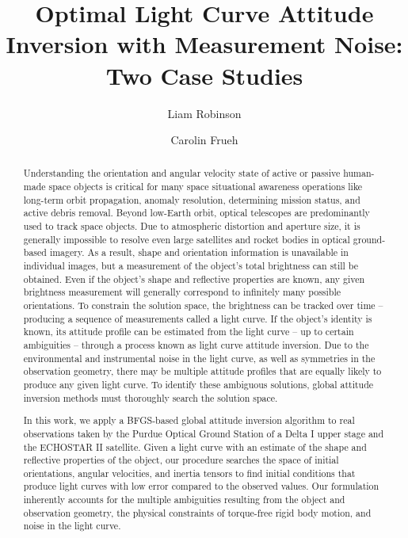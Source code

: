 \documentclass[a4paper,twocolumn]{spaceDebrisC} %
\title{Optimal Light Curve Attitude Inversion with Measurement Noise: Two Case Studies}
\author{Liam Robinson}
\author{Carolin Frueh}
\affil{Purdue University, West Lafayette, United States, Email: \texttt{\{robin502, cfrueh\}$@$purdue.edu}}
\begin{document}

\maketitle

\begin{abstract}

Understanding the orientation and angular velocity state of active or passive human-made space objects is critical for many space situational awareness operations like long-term orbit propagation, anomaly resolution, determining mission status, and active debris removal. Beyond low-Earth orbit, optical telescopes are predominantly used to track space objects. Due to atmospheric distortion and aperture size, it is generally impossible to resolve even large satellites and rocket bodies in optical ground-based imagery. As a result, shape and orientation information is unavailable in individual images, but a measurement of the object's total brightness can still be obtained. Even if the object's shape and reflective properties are known, any given brightness measurement will generally correspond to infinitely many possible orientations. To constrain the solution space, the brightness can be tracked over time -- producing a sequence of measurements called a light curve. If the object's identity is known, its attitude profile can be estimated from the light curve -- up to certain ambiguities -- through a process known as light curve attitude inversion. Due to the environmental and instrumental noise in the light curve, as well as symmetries in the observation geometry, there may be multiple attitude profiles that are equally likely to produce any given light curve. To identify these ambiguous solutions, global attitude inversion methods must thoroughly search the solution space.

In this work, we apply a BFGS-based global attitude inversion algorithm to real observations taken by the Purdue Optical Ground Station of a Delta I upper stage and the ECHOSTAR II satellite. Given a light curve with an estimate of the shape and reflective properties of the object, our procedure searches the space of initial orientations, angular velocities, and inertia tensors to find initial conditions that produce light curves with low error compared to the observed values. Our formulation inherently accounts for the multiple ambiguities resulting from the object and observation geometry, the physical constraints of torque-free rigid body motion, and noise in the light curve.

\end{abstract}
\end{document}
